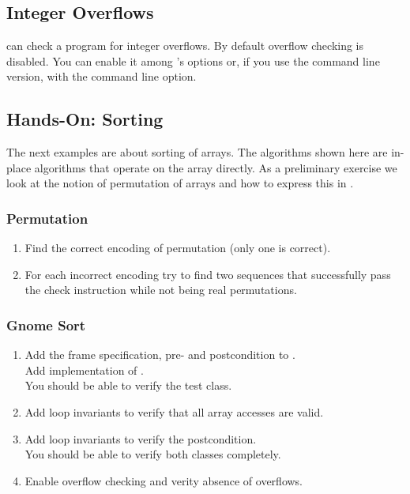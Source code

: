 \subsection{Integer Overflows} \label{sec:overflow}

\AutoProof can check a program for integer overflows. By default overflow checking is disabled. You can enable it among \AutoProof's options or, if you use the command line version, with the  command line option.

\subsection{Hands-On: Sorting}

The next examples are about sorting of arrays. The algorithms shown here are in-place algorithms that operate on the array directly. As a preliminary exercise we look at the notion of permutation of arrays and how to express this in \AutoProof.

\subsubsection*{Permutation}

\begin{enumerate}[label=\bfseries Task \arabic*:, leftmargin=1.8cm]
\item Find the correct encoding of permutation (only one is correct).
\item For each incorrect encoding try to find two sequences that successfully pass the check instruction while not being real permutations.
\end{enumerate}

\subsubsection*{Gnome Sort}

\begin{enumerate}[label=\bfseries Task \arabic*:, leftmargin=1.8cm]
\item Add the frame specification, pre- and postcondition to . \\
      Add implementation of . \\
      You should be able to verify the test class.
\item Add loop invariants to verify that all array accesses are valid.
\item Add loop invariants to verify the postcondition. \\
      You should be able to verify both classes completely.
\item Enable overflow checking and verity absence of overflows.
\end{enumerate}

